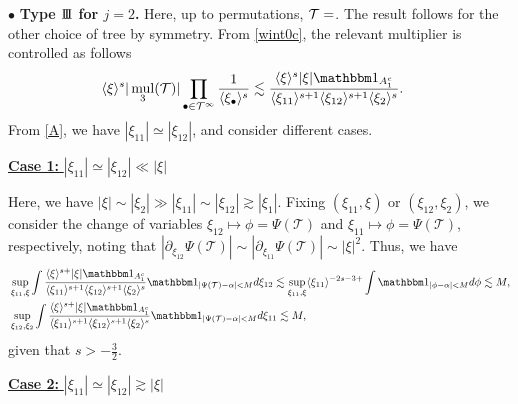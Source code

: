 \documentclass[a4paper,
11pt,  reqno]{amsart}
\makeatletter
\newcommand{\III}{\textup{I \hspace{-2.9mm} I \hspace{-2.9mm} I}}
\newcommand{\5}{\textup{V}}
\newcommand{\noi}{\noindent}
\newcommand{\ind}{\mathbbm 1}
\newcommand{\les}{\lesssim}
\theoremstyle{remark}
\newcommand{\bul}{\bullet}
\newcommand{\TT}{\mathcal{T}}
\newcommand{\al}{\alpha}
\newcommand{\ges}{\gtrsim}
\newcommand{\jb}[1]
{\langle #1 \rangle}
\DeclareMathOperator{\mul}{mul}
\def\<#1>{\csname MH@symb@#1\endcsname}
\numberwithin{equation}{section}
\numberwithin{theorem}{section}
\makeatother
\begin{document}
\smallskip

\noi
$\bul$ \textbf{Type $\III$ for $j=2$.}
Here, up to permutations, $\TT=\<21>$. The result follows for the other choice of tree by symmetry.
From \eqref{wint0c}, the relevant multiplier is controlled as follows
\begin{align}
    \jb{\xi}^s | \mul_3 (\TT)|
    \prod_{\bul \in \TT^\infty} \frac{1}{\jb{\xi_\bul}^s}
    &
    \les
    \frac{\jb{\xi}^{s} |\xi|  \ind_{A_1^c} }{ \jb{\xi_{11}}^{s+1} \jb{\xi_{12}}^{s+1} \jb{\xi_{2}}^s}
    .
\end{align}
 From \eqref{A}, we have $|\xi_{11}| \simeq |\xi_{12}|$, and consider different cases.


\smallskip
\noi
\underline{\textbf{Case 1:} $|\xi_{11}| \simeq |\xi_{12}| \ll |\xi|$}

Here, we have $|\xi| \sim |\xi_2| \gg |\xi_{11}| \sim |\xi_{12}| \ges |\xi_1|$.
Fixing $(\xi_{11},\xi)$ or $(\xi_{12}, \xi_2)$, we consider the change of variables $\xi_{12} \mapsto \phi = \Psi(\TT)$ and $\xi_{11} \mapsto \phi = \Psi(\TT)$, respectively, noting that $|\partial_{\xi_{12}} \Psi(\TT)| \sim |\partial_{\xi_{11}} \Psi(\TT)| \sim |\xi|^2 $. Thus, we have
\begin{align}
&
    \sup_{\xi_{11}, \xi}
    \int
    \frac{\jb{\xi}^{s+} |\xi|  \ind_{A_1^c} }{ \jb{\xi_{11}}^{s+1} \jb{\xi_{12}}^{s+1} \jb{\xi_{2}}^s}
    \ind_{|\Psi(\TT)- \al | < M } d\xi_{12}
    \les
    \sup_{\xi_{11},\xi} \jb{\xi_{11}}^{-2s -3 +} \int \ind_{|\phi-\al|<M} d\phi \les M
    ,
    \\
    &
    \sup_{\xi_{12}, \xi_2}
    \int
    \frac{\jb{\xi}^{s+} |\xi|  \ind_{A_1^c} }{ \jb{\xi_{11}}^{s+1} \jb{\xi_{12}}^{s+1} \jb{\xi_{2}}^s}
    \ind_{|\Psi(\TT)- \al | < M } d\xi_{11}
    \les M ,
\end{align}
given that $s>-\frac32$.


\smallskip
\noi
\underline{\textbf{Case 2:} $|\xi_{11}| \simeq |\xi_{12}| \ges |\xi|$}
\end{document}
